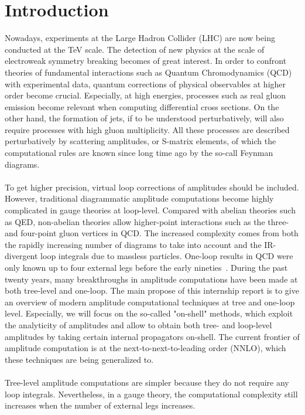\section{Introduction}
Nowadays, experiments at the Large Hadron Collider (LHC) are now being conducted at the TeV scale.
The detection of new physics at the scale of electroweak symmetry breaking becomes of great interest. 
In order to confront theories of fundamental interactions such as Quantum Chromodynamics (QCD) with experimental data,
quantum corrections of physical observables at higher order become crucial. 
Especially, at high energies, processes such as real gluon emission become relevant when computing differential cross sections. 
On the other hand, the formation of jets, if to be understood perturbatively, will also require processes with high gluon multiplicity.
All these processes are described perturbatively by scattering amplitudes, or S-matrix elements, of which the computational rules are known since long time ago by the so-call Feynman diagrams. 
\\\\
To get higher precision, virtual loop corrections of amplitudes should be included.
However, traditional diagrammatic amplitude computations become highly complicated in gauge theories at loop-level.
Compared with abelian theories such as QED, non-abelian theories allow higher-point interactions such as the three- and four-point gluon vertices in QCD.
The increased complexity comes from both the rapidly increasing number of diagrams to take into account and the IR-divergent loop integrals due to massless particles.  
One-loop results in QCD were only known up to four external legs before the early nineties~\cite{Bern:1994zx}. 
During the past twenty years, many breakthroughs in amplitude computations have been made at both tree-level and one-loop.
The main propose of this internship report is to give an overview of modern amplitude computational techniques at tree and one-loop level.
Especially, we will focus on the so-called "on-shell" methods, which exploit the analyticity of amplitudes and allow to obtain both tree- and loop-level amplitudes by taking certain internal propagators on-shell.  
The current frontier of amplitude computation is at the next-to-next-to-leading order (NNLO), which these techniques are being generalized to.
\\\\
Tree-level amplitude computations are simpler because they do not require any loop integrals.
Nevertheless, in a gauge theory, the computational complexity still increases when the number of external legs increases.
